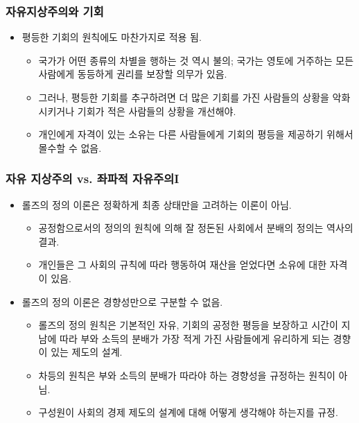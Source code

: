 \documentclass[aspectratio=169,xcolor=dvipsnames,handout]{beamer}
\begin{document}
\begin{frame}[<+->]
\frametitle{자유지상주의와 기회}
    \begin{itemize}
        \item 평등한 기회의 원칙에도 마찬가지로 적용 됨.
        \begin{itemize}
            \item 국가가 어떤 종류의 차별을 행하는 것 역시 불의; 국가는 영토에 거주하는 모든 사람에게 동등하게 권리를 보장할 의무가 있음.
            \item 그러나, 평등한 기회를 추구하려면 더 많은 기회를 가진 사람들의 상황을 악화시키거나 기회가 적은 사람들의 상황을 개선해야.
            \item 개인에게 자격이 있는 소유는 다른 사람들에게 기회의 평등을 제공하기 위해서 몰수할 수 없음.
        \end{itemize}
    \end{itemize}
\end{frame}

\begin{frame}[<+->]
\frametitle{자유 지상주의 vs. 좌파적 자유주의I}
    \begin{itemize}
        \item 롤즈의 정의 이론은 정확하게 최종 상태만을 고려하는 이론이 아님. 
        \begin{itemize}
            \item 공정함으로서의 정의의 원칙에 의해 잘 정돈된 사회에서 분배의 정의는 역사의 결과.
            \item 개인들은 그 사회의 규칙에 따라 행동하여 재산을 얻었다면 소유에 대한 자격이 있음.
        \end{itemize}
        \item 롤즈의 정의 이론은 경향성만으로 구분할 수 없음.
        \begin{itemize}
             \item 롤즈의 정의 원칙은 기본적인 자유, 기회의 공정한 평등을 보장하고 시간이 지남에 따라 부와 소득의 분배가 가장 적게 가진 사람들에게 유리하게 되는 경향이 있는 제도의 설계.
             \item 차등의 원칙은 부와 소득의 분배가 따라야 하는 경향성을 규정하는 원칙이 아님.
             \item 구성원이 사회의 경제 제도의 설계에 대해 어떻게 생각해야 하는지를 규정.
        \end{itemize}
    \end{itemize}
\end{frame}
\end{document}
